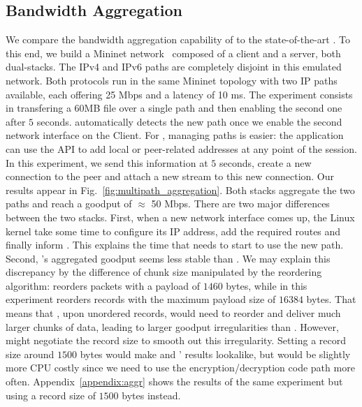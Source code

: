 \subsection{Bandwidth Aggregation}
\label{sec:bwaggr}
We compare the bandwidth aggregation capability of \tcpls to the state-of-the-art
\mptcp. To this end, we build a Mininet network~\cite{handigol2012reproducible}
composed of a client and a server, both
dual-stacks. The IPv4 and IPv6 paths are completely disjoint in this emulated
network.
Both protocols run in the same Mininet topology with two IP paths available,
each offering 25 Mbps and a latency of 10 ms.
The experiment consists in transfering
a 60MB file over a single path and then enabling the second one after $5$ seconds.
\mptcp automatically detects the new path once we enable the second network interface
on the Client. For
\tcpls, managing paths is easier: the application can use the API to add local
or peer-related addresses at any point of the session. In this experiment, we send
this information at $5$ seconds, create a new \tcp connection to the peer and
attach a new stream to this new connection. Our results appear in
Fig.~\ref{fig:multipath_aggregation}. Both stacks aggregate the two paths and reach a
goodput of $\approx$ 50 Mbps. There are two major differences between the two stacks.
First, when a new network interface comes up, the Linux kernel take some time to configure its IP address, add the required routes and finally inform \mptcp \cite{paasch2012exploring}.
This explains the time that \mptcp needs to start to use the new path.
Second, \tcpls's aggregated
goodput seems less stable than \mptcp. We may explain this discrepancy by the
difference of chunk size manipulated by the reordering algorithm: \mptcp
reorders packets with a payload of $1460$ bytes, while \tcpls in this experiment
reorders records with the maximum payload size of $16384$ bytes. That means
that \tcpls, upon unordered records, would need to reorder and deliver much
larger chunks of data, leading to larger goodput irregularities than \mptcp.
However, \tcpls might negotiate the record size to smooth out this
irregularity. Setting a record size around $1500$ bytes would make \mptcp and
\tcpls' results lookalike, but would be slightly more CPU costly since we need
to use the encryption/decryption code path more often.
Appendix~\ref{appendix:aggr} shows the results of the same experiment but using
a \tls record size of $1500$ bytes instead.

